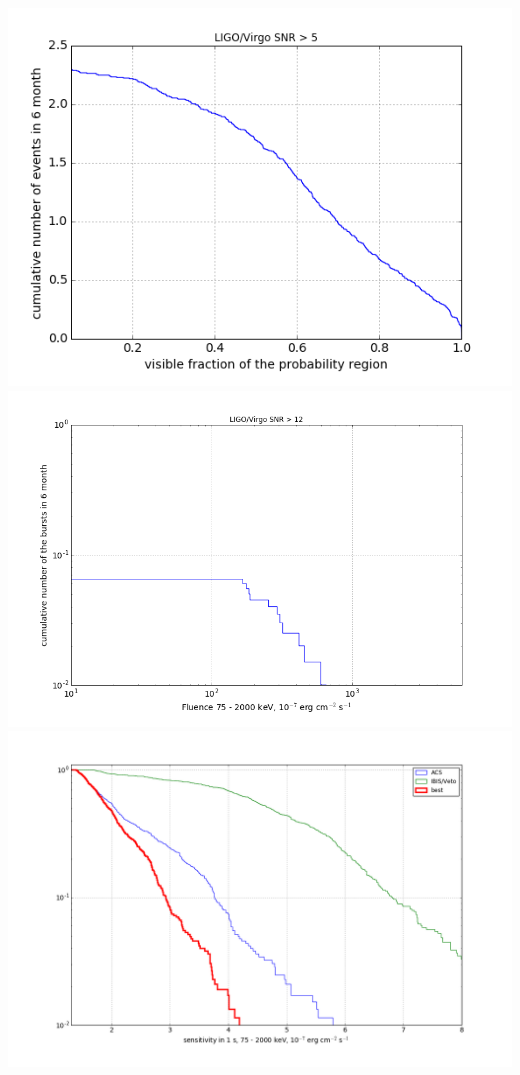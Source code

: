 \documentclass[a0,portrait]{a0poster}
\begin{document}
\begin{multicols}{2}
\begin{center}\vspace{.5cm}
    \includegraphics[scale=.6]{figures/covered_region.png}
    \includegraphics[scale=.45]{figures/fluence_distribution_12.png}
    \includegraphics[scale=.37]{figures/sensitivity_distribution_pe.png}

\end{center}
\end{multicols}
\end{document}
